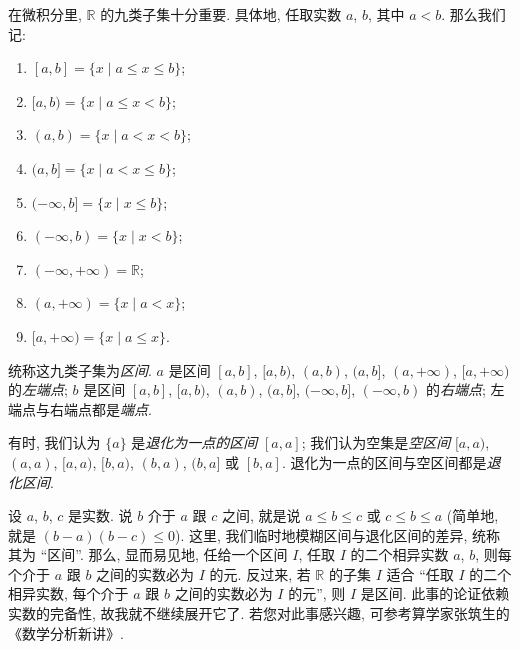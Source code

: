 \begin{definition}
    在微积分里, $\mathbb{R}$ 的九类子集十分重要. 具体地, 任取实数 $a$, $b$, 其中 $a < b$. 那么我们记:
    \begin{enumerate}
        \item $[a, b] = \{ x \mid a \leq x \leq b \}$;
        \item $[a, b) = \{ x \mid a \leq x < b \}$;
        \item $(a, b) = \{ x \mid a < x < b \}$;
        \item $(a, b] = \{ x \mid a < x \leq b \}$;
        \item $(-\infty, b] = \{ x \mid x \leq b \}$;
        \item $(-\infty, b) = \{ x \mid x < b \}$;
        \item $(-\infty, +\infty) = \mathbb{R}$;
        \item $(a, +\infty) = \{ x \mid a < x \}$;
        \item $[a, +\infty) = \{ x \mid a \leq x \}$.
    \end{enumerate}
    统称这九类子集为\emph{区间}. $a$ 是区间 $[a, b]$, $[a, b)$, $(a, b)$, $(a, b]$, $(a, +\infty)$, $[a, +\infty)$ 的\emph{左端点}; $b$ 是区间 $[a, b]$, $[a, b)$, $(a, b)$, $(a, b]$, $(-\infty, b]$, $(-\infty, b)$ 的\emph{右端点}; 左端点与右端点都是\emph{端点}.

    有时, 我们认为 $\{ a \}$ 是\emph{退化为一点的区间} $[a, a]$; 我们认为空集是\emph{空区间} $[a, a)$, $(a, a)$, $[a, a)$, $[b, a)$, $(b, a)$, $(b, a]$ 或 $[b, a]$. 退化为一点的区间与空区间都是\emph{退化区间}.
\end{definition}

\begin{remark}
    设 $a$, $b$, $c$ 是实数. 说 $b$ 介于 $a$ 跟 $c$ 之间, 就是说 $a \leq b \leq c$ 或 $c \leq b \leq a$ (简单地, 就是 $(b - a)(b - c) \leq 0$). 这里, 我们临时地模糊区间与退化区间的差异, 统称其为 ``区间''. 那么, 显而易见地, 任给一个区间 $I$, 任取 $I$ 的二个相异实数 $a$, $b$, 则每个介于 $a$ 跟 $b$ 之间的实数必为 $I$ 的元. 反过来, 若 $\mathbb{R}$ 的子集 $I$ 适合 ``任取 $I$ 的二个相异实数, 每个介于 $a$ 跟 $b$ 之间的实数必为 $I$ 的元'', 则 $I$ 是区间. 此事的论证依赖实数的完备性, 故我就不继续展开它了. 若您对此事感兴趣, 可参考算学家张筑生的《数学分析新讲》.
\end{remark}

